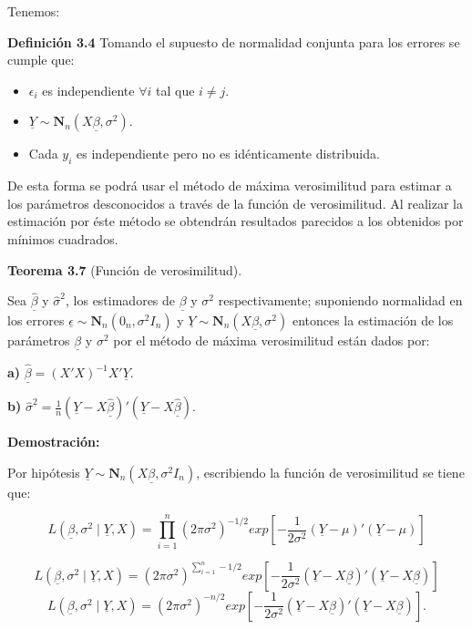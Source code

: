 \documentclass[
  a4paper,
  oneside,
  openany]{book}
\begin{document}
Tenemos:

\textbf{Definición 3.4} Tomando el supuesto de normalidad conjunta para los errores se cumple que:

\begin{itemize}
\item
  \(\epsilon_{i}\) es independiente \(\forall i\) tal que \(i \neq j.\)
\item
  \(\underline{Y}\sim \mathbf{N}_{n}(X\underline{\beta},\sigma^2).\)
\item
  Cada \(y_{i}\) es independiente pero no es idénticamente distribuida.
\end{itemize}

De esta forma se podrá usar el método de máxima verosimilitud para estimar a los parámetros desconocidos a través de la función de verosimilitud. Al realizar la estimación por éste método se obtendrán resultados parecidos a los obtenidos por mínimos cuadrados.

\textbf{Teorema 3.7} (Función de verosimilitud).

Sea \(\underline{\hat{\beta}}\) y \(\hat{\sigma}^2\), los estimadores de \(\underline{\beta}\) y \(\sigma^2\) respectivamente; suponiendo normalidad en los errores \(\underline{\epsilon} \sim \mathbf{N}_{n}(0_{n},\sigma^2 I_{n})\) y \(\underline{Y}\sim \mathbf{N}_{n}(X \underline{\beta},\sigma^2)\) entonces la estimación de los parámetros \(\underline{\beta}\) y \(\sigma^2\) por el método de máxima verosimilitud están dados por:

\textbf{a)} \(\underline{\hat{\beta}}=(X'X)^{-1}X'\underline{Y}\).

\textbf{b)} \(\hat{\sigma}^2=\frac{1}{n}\left( \underline{Y}-X\underline{\hat{\beta}}\right)'\left(\underline{Y}-X \underline{\hat{\beta}}\right).\)

\textbf{Demostración:}

Por hipótesis \(\underline{Y}\sim \mathbf{N}_{n}(X\underline{\beta},\sigma^2 I_{n})\), escribiendo la función de verosimilitud se tiene que:

\[
L(\underline{\beta},\sigma^2 \mid \underline{Y},X)=\prod_{i=1}^{n}(2\pi\sigma^2)^{-1/2} exp \left[ - \frac{1}{2\sigma^2}(\underline{Y}-\mu)'(\underline{Y}-\mu) \right]
\]

\[
L(\underline{\beta},\sigma^2 \mid \underline{Y},X)=(2\pi\sigma^2)^{\sum_{i=1}^{n}-1/2} exp \left[ - \frac{1}{2\sigma^2}(\underline{Y}-X\underline{\beta})'(\underline{Y}-X\underline{\beta}) \right]
\]
\[
L(\underline{\beta},\sigma^2 \mid \underline{Y},X)=(2\pi\sigma^2)^{-n/2} exp \left[ - \frac{1}{2\sigma^2}(\underline{Y}-X\underline{\beta})'(\underline{Y}-X\underline{\beta}) \right].
\]
\end{document}
